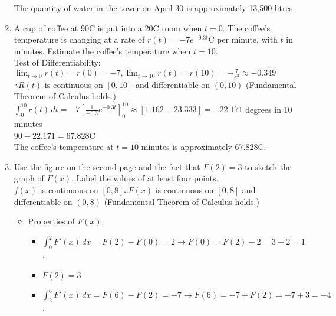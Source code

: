 \documentclass[10pt, letterpaper]{report}
\begin{document}
\begin{enumerate}
      The quantity of water in the tower on April 30 is approximately 13,500 litres.
    \item{A cup of coffee at 90\degree C is put into a 20\degree C room when $t=0$. The coffee's temperature is changing at a rate of $r(t)=-7e^{-0.3t}$\degree C per minute, with $t$ in minutes. Estimate the coffee's temperature when $t=10$.} \\

      Test of Differentiability:
      $\lim_{t\to 0}r(t)=r(0)=-7,
      \lim_{t\to 10}r(t)=r(10)=-\frac{7}{e^{3}}\approx-0.349$ \\
      $\therefore R(t)$ is continuous on $[0,10]$ and differentiable on $(0,10)$ (Fundamental Theorem of Calculus holds.) \\

      $\int_{0}^{10}{r(t)}\,dt=
      -7[\frac{1}{-0.3}e^{-0.3t}]_{0}^{10}\approx
      [1.162-23.333]=-22.171$ degrees in 10 minutes \\

      $90-22.171=67.828$\degree C \\

      The coffee's temperature at $t=10$ minutes is approximately 67.828\degree C. \\
\pagebreak
    \item{Use the figure on the second page and the fact that $F(2)=3$ to sketch the graph of $F(x)$. Label the values of at least four points.} \\

      $f(x)$ is continuous on $[0,8]\therefore F(x)$ is continuous on $[0,8]$ and differentiable on $(0,8)$ (Fundamental Theorem of Calculus holds.) \\

      \begin{itemize}
        \item{Properties of $F(x)$:}
        \begin{itemize}
          \item{$\int_{0}^{2}{F'(x)}\,dx=
            F(2)-F(0)=2\rightarrow
            F(0)=F(2)-2=3-2=1$.} \\

          \item{$F(2)=3$} \\

          \item{$\int_{2}^{6}{F'(x)}\,dx=
            F(6)-F(2)=-7\rightarrow
            F(6)=
            -7+F(2)=
            -7+3=-4$.} \\


\end{itemize}
\end{itemize}
\end{enumerate}
\end{document}
